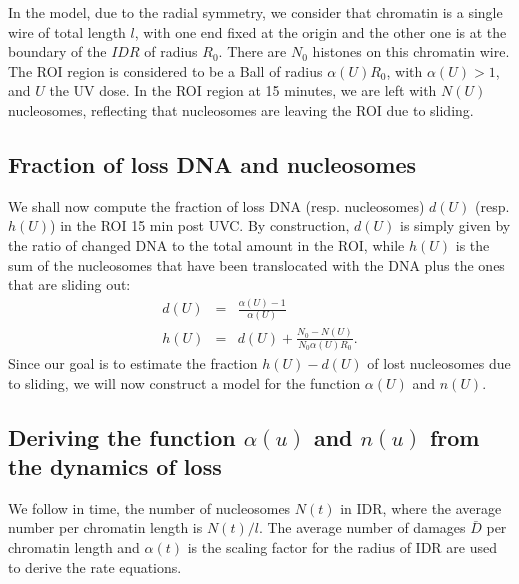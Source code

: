 \documentclass[12pt]{article}
\newcommand{\beq}{\begin{eqnarray}}
\newcommand{\eeq}{\end{eqnarray}}
\begin{document}
In the model, due to the radial symmetry, we consider that chromatin is a single wire of total length $l$, with one end fixed at the origin and the other one is at the boundary of the $IDR$ of radius $R_0$. There are $N_0$ histones on this chromatin wire.  The ROI region is considered to be a Ball of radius $\alpha(U) R_0$, with  $\alpha(U)>1$, and $U$ the UV dose. In the ROI region at 15 minutes, we are left with $N(U)$ nucleosomes, reflecting that nucleosomes are leaving the ROI due to sliding.
\subsection{Fraction of loss DNA and nucleosomes }
We shall now compute the fraction of loss DNA (resp. nucleosomes) $d(U)$ (resp. $h(U)$) in the ROI 15 min post UVC. By construction, $d(U)$ is simply given by the ratio of changed DNA to the total amount in the ROI, while $h(U)$ is the sum of the nucleosomes that have been translocated with the DNA plus the ones that are sliding out:
\beq
d(U)&=& \frac{\alpha(U) -1}{\alpha(U)} \\
h(U)&=&d(U)+\frac{N_0-N(U)}{N_0 \alpha(U) R_0}.
\eeq
Since our goal is to estimate the fraction $h(U)-d(U)$ of lost nucleosomes due to sliding, we will now construct a model for the function $\alpha(U)$ and $n(U)$.
\subsection{Deriving the function $\alpha(u)$ and $n(u)$ from the dynamics of loss}
We follow in time, the number of nucleosomes $N(t)$ in IDR, where the average number per chromatin length is $N(t)/l$. The average number of damages $\bar{D}$ per chromatin length and $\alpha(t)$ is the scaling factor for the radius of IDR are used to derive the rate equations.
\end{document}
